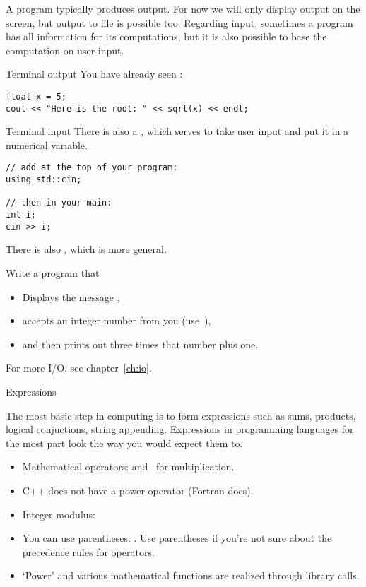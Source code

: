 A program typically produces output. For now we will only display
output on the screen, but output to file is possible too.  Regarding
input, sometimes a program has all information for its computations,
but it is also possible to base the computation on user input.

\begin{block}{Terminal output}
  \label{sl:cout}
You have already seen :
\begin{verbatim}
float x = 5;
cout << "Here is the root: " << sqrt(x) << endl;
\end{verbatim}
\end{block}

\begin{block}{Terminal input}
  \label{sl:cin}
  There is also a , which serves to take user input and
  put it in a numerical variable.
\begin{verbatim}
// add at the top of your program:
using std::cin;

// then in your main:
int i;
cin >> i;
\end{verbatim}
There is also , which is more general.
\end{block}

\begin{exercise}
  \label{ex:cin-cout3np1}
  Write a program that 
  \begin{itemize}
  \item Displays the message ,
  \item accepts an integer number from you (use~),
  \item and then prints out three times that number plus one.
  \end{itemize}
\end{exercise}

For more I/O, see chapter~\ref{ch:io}.

 {Expressions}
\label{sec:expr}

The most basic step in computing is to form expressions such as sums,
products, logical conjuctions, string appending. Expressions in
programming languages for the most part look the way you would expect
them to.
\begin{itemize}
\item Mathematical operators: \n{+ - /} and \n{*}~for multiplication.
\item C++ does not have a power operator (Fortran does).
\item Integer modulus:~
\item You can use parentheses: . Use parentheses if you're
  not sure about the precedence rules for operators.
\item `Power' and various mathematical functions are realized through
  library calls.
\end{itemize}

